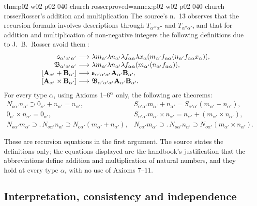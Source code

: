 \begin{hbtheorem}{thm:p02-w02-p02-040-church-rosser}{proved=annex:p02-w02-p02-040-church-rosser}{Rosser's addition and multiplication}
The source's n.~13 observes that the recursion formula involves
descriptions through \(T_{\alpha'''\alpha''}\) and \(T_{\alpha''\alpha'}\), and
that for addition and multiplication of non-negative integers the following
definitions due to J.~B.~Rosser avoid them \cite[\S8, p.~68, n.~13]{Church1940}:
\[
\begin{array}{r@{\ \longrightarrow\ }l}
 \mathfrak s_{\alpha'\alpha'\alpha'} & \lambda m_{\alpha'}\lambda n_{\alpha'}\lambda f_{\alpha\alpha}\lambda x_\alpha(m_{\alpha'}f_{\alpha\alpha}(n_{\alpha'}f_{\alpha\alpha}x_\alpha)),\\
 \mathfrak B_{\alpha'\alpha'\alpha'} & \lambda m_{\alpha'}\lambda n_{\alpha'}\lambda f_{\alpha\alpha}(m_{\alpha'}(n_{\alpha'}f_{\alpha\alpha})),\\
 {}[\mathbf A_{\alpha'}+\mathbf B_{\alpha'}] & \mathfrak s_{\alpha'\alpha'\alpha'}\mathbf A_{\alpha'}\mathbf B_{\alpha'},\\
 {}[\mathbf A_{\alpha'}\times\mathbf B_{\alpha'}] & \mathfrak B_{\alpha'\alpha'\alpha'}\mathbf A_{\alpha'}\mathbf B_{\alpha'}.
\end{array}
\]
For every type \(\alpha\), using Axioms 1--6\(^\alpha\) only, the following are
theorems:
\[
\begin{array}{ll}
 N_{o\alpha'}n_{\alpha'}\supset0_{\alpha'}+n_{\alpha'}=n_{\alpha'}, &
 S_{\alpha'\alpha'}m_{\alpha'}+n_{\alpha'}=S_{\alpha'\alpha'}(m_{\alpha'}+n_{\alpha'}),\\
 0_{\alpha'}\times n_{\alpha'}=0_{\alpha'}, &
 S_{\alpha'\alpha'}m_{\alpha'}\times n_{\alpha'}=n_{\alpha'}+(m_{\alpha'}\times n_{\alpha'}),\\
 N_{o\alpha'}m_{\alpha'}\supset.\,N_{o\alpha'}n_{\alpha'}\supset N_{o\alpha'}(m_{\alpha'}+n_{\alpha'}), &
 N_{o\alpha'}m_{\alpha'}\supset.\,N_{o\alpha'}n_{\alpha'}\supset N_{o\alpha'}(m_{\alpha'}\times n_{\alpha'}).
\end{array}
\]
\end{hbtheorem}

These are recursion equations in the first argument.  The source states the
definitions only; the equations displayed are the handbook's justification
that the abbreviations define addition and multiplication of natural numbers,
and they hold at every type \(\alpha\), with no use of Axioms 7--11.

\subsection{Interpretation, consistency and independence}

